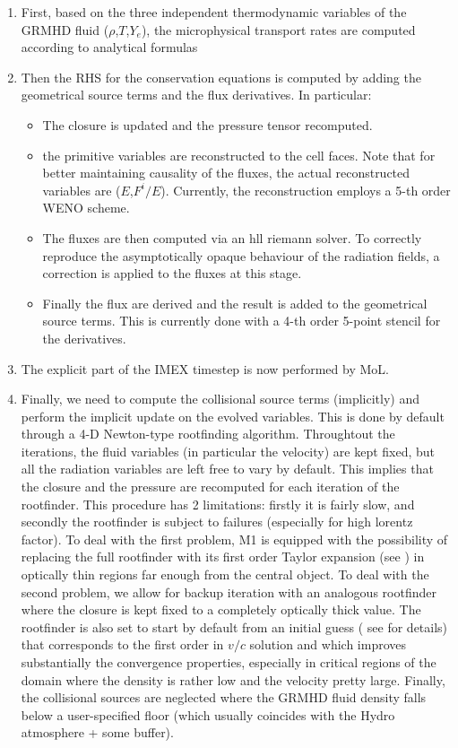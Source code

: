\begin{enumerate}
\item First, based on the three independent thermodynamic variables of the GRMHD fluid ($\rho$,$T$,$Y_e$), the microphysical transport rates are computed according to analytical formulas
\item Then the RHS for the conservation equations is computed by adding the geometrical source terms and the flux derivatives. In particular:
  \begin{itemize}
  \item The closure is updated and the pressure tensor recomputed.
  \item the primitive variables are reconstructed to the cell faces. Note that for better maintaining causality of the fluxes, the actual reconstructed variables are ($E$,$F^i/E$). Currently, the reconstruction employs a 5-th order WENO scheme.
  \item The fluxes are then computed via an hll riemann solver. To correctly reproduce the asymptotically opaque behaviour of the radiation fields, a correction is applied to the fluxes at this stage.
  \item Finally the flux are derived and the result is added to the geometrical source terms. This is currently done with a 4-th order 5-point stencil for the derivatives.
  \end{itemize}
\item The explicit part of the IMEX timestep is now performed by MoL.
\item Finally, we need to compute the collisional source terms (implicitly) and perform the implicit update on the evolved variables. This is done by default through a 4-D Newton-type rootfinding algorithm. Throughtout the iterations, the fluid variables (in particular the velocity) are kept fixed, but all the radiation variables are left free to vary by default. This implies that the closure and the pressure are recomputed for each iteration of the rootfinder. This procedure has 2 limitations: firstly it is fairly slow, and secondly the rootfinder is subject to failures (especially for high lorentz factor). To deal with the first problem, M1 is equipped with the possibility of replacing the full rootfinder with its first order Taylor expansion (see \cite{FILM1_FIL_M1_Weih2020}) in optically thin regions far enough from the central object. To deal with the second problem, we allow for backup iteration with an analogous rootfinder where the closure is kept fixed to a completely optically thick value. The rootfinder is also set to start by default from an initial guess ( see \cite{FILM1_FIL_M1_RadiceM1} for details) that corresponds to  the first order in $v/c$ solution and which improves substantially the convergence properties, especially in critical regions of the domain where the density is rather low and the velocity pretty large. Finally, the collisional sources are neglected where the GRMHD fluid density falls below a user-specified floor (which usually coincides with the Hydro atmosphere + some buffer). 
\end{enumerate}

